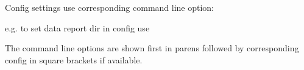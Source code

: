 \documentclass[letterpaper,10pt,english]{sphinxmanual}
\begin{document}
\sphinxAtStartPar
Config settings use corresponding command line option:

\begin{sphinxVerbatim}[commandchars=\\\{\}]
  
\end{sphinxVerbatim}

\sphinxAtStartPar
e.g. to set data report dir in config use

\begin{sphinxVerbatim}[commandchars=\\\{\}]
  
\end{sphinxVerbatim}

\sphinxAtStartPar
The command line options are shown first in parens followed by
corresponding config in square brackets if available.
\end{document}
